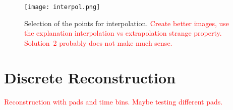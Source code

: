			\begin{figure}
				\centering
				\texttt{[image: interpol.png]}
				\caption{Selection of the points for interpolation. \textcolor{red}{Create better images, use the explanation interpolation vs extrapolation strange property. Solution~2 probably does not make much sense.}}
				\label{fig:interpol}
			\end{figure}
		
	\section{Discrete Reconstruction}
		\textcolor{red}{Reconstruction with pads and time bins. Maybe testing different pads.}